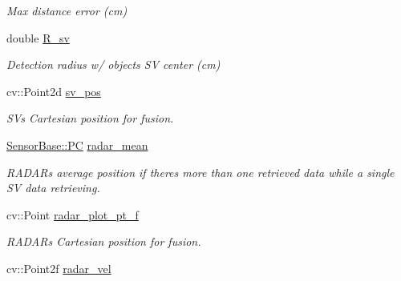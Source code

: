 \begin{DoxyCompactItemize}
\begin{DoxyCompactList}\small\item\em Max distance error (cm) \end{DoxyCompactList}\item 
\hypertarget{class_sensor_info_ae483e67380ee479e1dee1840644105c9}{}double \hyperlink{class_sensor_info_ae483e67380ee479e1dee1840644105c9}{R\+\_\+sv}\label{class_sensor_info_ae483e67380ee479e1dee1840644105c9}

\begin{DoxyCompactList}\small\item\em Detection radius w/ object\textquotesingle{}s S\+V center (cm) \end{DoxyCompactList}\item 
\hypertarget{class_sensor_info_a5af9d7c15dae1f54f1fc827b842179dc}{}cv\+::\+Point2d \hyperlink{class_sensor_info_a5af9d7c15dae1f54f1fc827b842179dc}{sv\+\_\+pos}\label{class_sensor_info_a5af9d7c15dae1f54f1fc827b842179dc}

\begin{DoxyCompactList}\small\item\em S\+V\textquotesingle{}s Cartesian position for fusion. \end{DoxyCompactList}\item 
\hypertarget{class_sensor_info_ab757056695c005f6e0587cd2828206af}{}\hyperlink{struct_sensor_base_1_1_p_c}{Sensor\+Base\+::\+P\+C} \hyperlink{class_sensor_info_ab757056695c005f6e0587cd2828206af}{radar\+\_\+mean}\label{class_sensor_info_ab757056695c005f6e0587cd2828206af}

\begin{DoxyCompactList}\small\item\em R\+A\+D\+A\+R\textquotesingle{}s average position if there\textquotesingle{}s more than one retrieved data while a single S\+V data retrieving. \end{DoxyCompactList}\item 
\hypertarget{class_sensor_info_ad03bdf102a3198e3d7a1e63ecc458b14}{}cv\+::\+Point \hyperlink{class_sensor_info_ad03bdf102a3198e3d7a1e63ecc458b14}{radar\+\_\+plot\+\_\+pt\+\_\+f}\label{class_sensor_info_ad03bdf102a3198e3d7a1e63ecc458b14}

\begin{DoxyCompactList}\small\item\em R\+A\+D\+A\+R\textquotesingle{}s Cartesian position for fusion. \end{DoxyCompactList}\item 
\hypertarget{class_sensor_info_a1f6c558bd14ebea1afd4340dd192c2fa}{}cv\+::\+Point2f \hyperlink{class_sensor_info_a1f6c558bd14ebea1afd4340dd192c2fa}{radar\+\_\+vel}\label{class_sensor_info_a1f6c558bd14ebea1afd4340dd192c2fa}


\end{DoxyCompactItemize}
